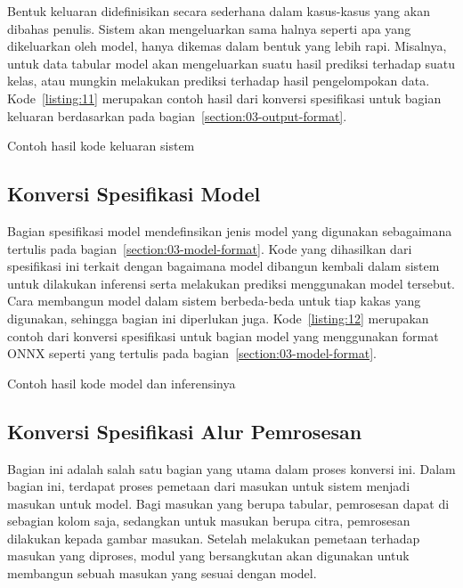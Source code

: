 Bentuk keluaran didefinisikan secara sederhana dalam kasus-kasus yang akan dibahas penulis.
Sistem akan mengeluarkan sama halnya seperti apa yang dikeluarkan oleh model, hanya dikemas dalam bentuk yang lebih rapi.
Misalnya, untuk data tabular model akan mengeluarkan suatu hasil prediksi terhadap suatu kelas, atau mungkin melakukan prediksi terhadap hasil pengelompokan data.
Kode~\ref{listing:11} merupakan contoh hasil dari konversi spesifikasi untuk bagian keluaran berdasarkan pada bagian~\ref{section:03-output-format}.

\begin{code}
	\caption{Contoh hasil kode keluaran sistem}\label{listing:11}
\end{code}

\subsection{Konversi Spesifikasi Model}

Bagian spesifikasi model mendefinsikan jenis model yang digunakan sebagaimana tertulis pada bagian~\ref{section:03-model-format}.
Kode yang dihasilkan dari spesifikasi ini terkait dengan bagaimana model dibangun kembali dalam sistem untuk dilakukan inferensi serta melakukan prediksi menggunakan model tersebut.
Cara membangun model dalam sistem berbeda-beda untuk tiap kakas yang digunakan, sehingga bagian ini diperlukan juga.
Kode~\ref{listing:12} merupakan contoh dari konversi spesifikasi untuk bagian model yang menggunakan format ONNX seperti yang tertulis pada bagian~\ref{section:03-model-format}.

\begin{code}
	\caption{Contoh hasil kode model dan inferensinya}\label{listing:12}
\end{code}

\subsection{Konversi Spesifikasi Alur Pemrosesan}

Bagian ini adalah salah satu bagian yang utama dalam proses konversi ini.
Dalam bagian ini, terdapat proses pemetaan dari masukan untuk sistem menjadi masukan untuk model.
Bagi masukan yang berupa tabular, pemrosesan dapat di sebagian kolom saja, sedangkan untuk masukan berupa citra, pemrosesan dilakukan kepada gambar masukan.
Setelah melakukan pemetaan terhadap masukan yang diproses, modul yang bersangkutan akan digunakan untuk membangun sebuah masukan yang sesuai dengan model.

